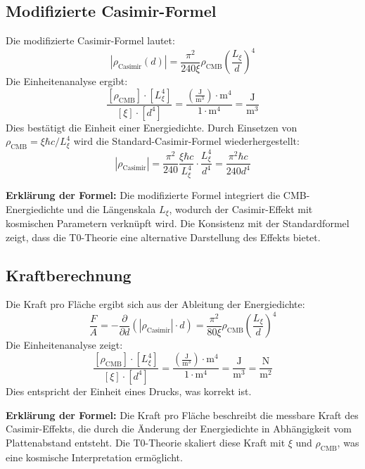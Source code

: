 \documentclass{article}
\begin{document}
	\subsection{Modifizierte Casimir-Formel}
	Die modifizierte Casimir-Formel lautet:
	\begin{equation}
		|\rho_{\text{Casimir}}(d)| = \frac{\pi^2}{240 \xi} \rho_{\text{CMB}} \left( \frac{L_\xi}{d} \right)^4
	\end{equation}
	Die Einheitenanalyse ergibt:
	\begin{equation}
		\frac{[\rho_{\text{CMB}}] \cdot [L_\xi^4]}{[\xi] \cdot [d^4]} = \frac{\left( \frac{\text{J}}{\text{m}^3} \right) \cdot \text{m}^4}{1 \cdot \text{m}^4} = \frac{\text{J}}{\text{m}^3}
	\end{equation}
	Dies bestätigt die Einheit einer Energiedichte. Durch Einsetzen von $\rho_{\text{CMB}} = \xi \hbar c / L_\xi^4$ wird die Standard-Casimir-Formel wiederhergestellt:
	\begin{equation}
		|\rho_{\text{Casimir}}| = \frac{\pi^2}{240} \frac{\xi \hbar c}{L_\xi^4} \cdot \frac{L_\xi^4}{d^4} = \frac{\pi^2 \hbar c}{240 d^4}
	\end{equation}
	
	\textbf{Erklärung der Formel:} Die modifizierte Formel integriert die CMB-Energiedichte und die Längenskala $L_\xi$, wodurch der Casimir-Effekt mit kosmischen Parametern verknüpft wird. Die Konsistenz mit der Standardformel zeigt, dass die T0-Theorie eine alternative Darstellung des Effekts bietet.
	
	\subsection{Kraftberechnung}
	Die Kraft pro Fläche ergibt sich aus der Ableitung der Energiedichte:
	\begin{equation}
		\frac{F}{A} = -\frac{\partial}{\partial d} \left( |\rho_{\text{Casimir}}| \cdot d \right) = \frac{\pi^2}{80 \xi} \rho_{\text{CMB}} \left( \frac{L_\xi}{d} \right)^4
	\end{equation}
	Die Einheitenanalyse zeigt:
	\begin{equation}
		\frac{[\rho_{\text{CMB}}] \cdot [L_\xi^4]}{[\xi] \cdot [d^4]} = \frac{\left( \frac{\text{J}}{\text{m}^3} \right) \cdot \text{m}^4}{1 \cdot \text{m}^4} = \frac{\text{J}}{\text{m}^3} = \frac{\text{N}}{\text{m}^2}
	\end{equation}
	Dies entspricht der Einheit eines Drucks, was korrekt ist.
	
	\textbf{Erklärung der Formel:} Die Kraft pro Fläche beschreibt die messbare Kraft des Casimir-Effekts, die durch die Änderung der Energiedichte in Abhängigkeit vom Plattenabstand entsteht. Die T0-Theorie skaliert diese Kraft mit $\xi$ und $\rho_{\text{CMB}}$, was eine kosmische Interpretation ermöglicht.
	
\end{document}
